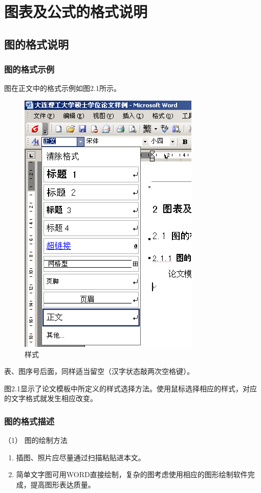 
\chapter{图表及公式的格式说明}
\label{chap02}
\section{图的格式说明}
\subsection{图的格式示例}
图在正文中的格式示例如图2.1所示。
\begin{figure}
	\centering
	\includegraphics[scale = 0.4]{figures/2.1}
	\caption{\song\wuhao 样式}
\end{figure}

表、图序号后面，同样适当留空（汉字状态敲两次空格键）。

图2.1显示了论文模板中所定义的样式选择方法。使用鼠标选择相应的样式，对应的文字格式就发生相应改变。

\subsection{图的格式描述}
（1） 图的绘制方法
\begin{enumerate}[label=\circled{\arabic*}]
\item 插图、照片应尽量通过扫描粘贴进本文。
\item 简单文字图可用WORD直接绘制，复杂的图考虑使用相应的图形绘制软件完成，提高图形表达质量。
\end{enumerate}

